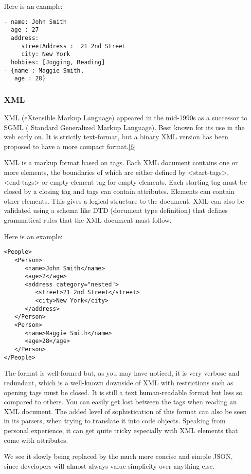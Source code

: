\documentclass[12pt]{article}
\begin{document}
Here is an example:

\begin{lstlisting}
- name: John Smith
  age : 27
  address:
     streetAddress :  21 2nd Street
     city: New York
  hobbies: [Jogging, Reading]
- {name : Maggie Smith,
   age : 28}
\end{lstlisting}

\subsubsection{XML}
XML (eXtensible Markup Language) appeared in the mid-1990s as a successor to SGML ( Standard Generalized Markup Language).  Best known for its use in the web early on. It is strictly text-format, but a binary XML version has been proposed to have a more compact format.\href{https://www.w3.org/2003/08/binary-interchange-workshop/29-MicrosoftPosition.htm}{[6]}

XML is a markup format based on tags. Each XML document contains one or more elements, the boundaries of which are either defined by <start-tags>, <end-tags> or empty-element tag for empty elements. Each starting tag must be closed by a closing tag and tags can contain attributes. Elements can contain other elements. This gives a logical structure to the document.
XML can also be validated using a schema like DTD (document type definition) that defines grammatical rules that the XML document must follow. 

Here is an example:
\begin{verbatim}
<People>
   <Person>
      <name>John Smith</name>
      <age>2</age>
      <address category="nested">
         <street>21 2nd Street</street>
         <city>New York</city>
      </address>
   </Person>
   <Person>
      <name>Maggie Smith</name>
      <age>28</age>
   </Person>
</People>
\end{verbatim}

The format is well-formed but, as you may have noticed, it is very verbose and redundant, which is a well-known downside of XML with restrictions such as opening tags must be closed. It is still a text human-readable format but less so compared to others. You can easily get lost between the tags when reading an XML document. The added level of sophistication of this format can also be seen in its parsers, when trying to translate it into code objects. Speaking from personal experience, it can get quite tricky especially with XML elements that come with attributes.

We see it slowly being replaced by the much more concise and simple JSON, since developers will almost always value simplicity over anything else. 
\end{document}
